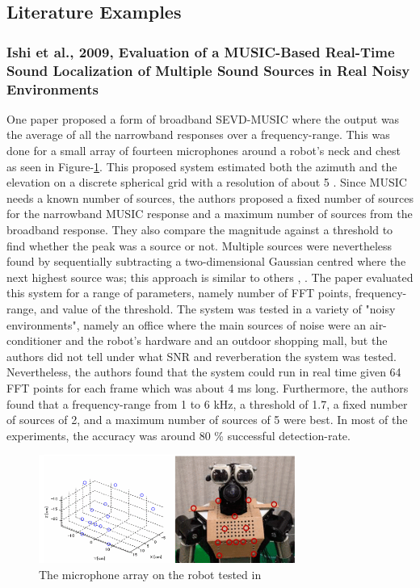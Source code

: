 \documentclass{report}
\begin{document}
\subsection{Literature Examples}

\subsubsection{Ishi et al., 2009, Evaluation of a MUSIC-Based Real-Time Sound Localization of Multiple Sound Sources in Real Noisy Environments}

One paper \cite{ishi_evaluation_2009} proposed a form of broadband SEVD-MUSIC where the output was the average of all the narrowband responses over a frequency-range. This was done for a small array of fourteen microphones around a robot's neck and chest as seen in Figure-\ref{fig:ishi_2009_array}. This proposed system estimated both the azimuth and the elevation on a discrete spherical grid with a resolution of about 5 \si{\deg}. Since MUSIC needs a known number of sources, the authors proposed a fixed number of sources for the narrowband MUSIC response and a maximum number of sources from the broadband response. They also compare the magnitude against a threshold to find whether the peak was a source or not. Multiple sources were nevertheless found by sequentially subtracting a two-dimensional Gaussian centred where the next highest source was; this approach is similar to others \cite{brutti_multiple_2010}, \cite{basiri_-board_2016}. The paper evaluated this system for a range of parameters, namely number of FFT points, frequency-range, and value of the threshold. The system was tested in a variety of "noisy environments", namely an office where the main sources of noise were an air-conditioner and the robot's hardware and an outdoor shopping mall, but the authors did not tell under what SNR and reverberation the system was tested. Nevertheless, the authors found that the system could run in real time given 64 FFT points for each frame which was about 4 \si{ms} long. Furthermore, the authors found that a frequency-range from 1 to 6 \si{kHz}, a threshold of 1.7, a fixed number of sources of 2, and a maximum number of sources of 5 were best. In most of the experiments, the accuracy was around 80 \% successful detection-rate.

\begin{figure}[H]
\includegraphics[width=0.75\textwidth]{./ishi_2009/array.png}
\centering
\caption{The microphone array on the robot tested in \cite{ishi_evaluation_2009}}
\label{fig:ishi_2009_array}
\centering
\end{figure}
\end{document}

